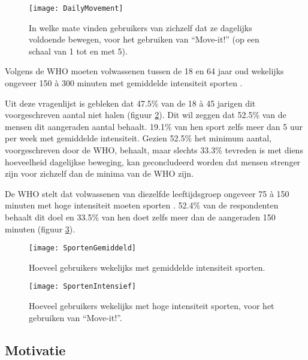 \begin{figure}
    \caption[In welke mate vinden gebruikers van zichzelf dat ze dagelijks voldoende bewegen, voor het gebruiken van ``Move-it!'']{In welke mate vinden gebruikers van zichzelf dat ze dagelijks voldoende bewegen, voor het gebruiken van ``Move-it!'' (op een schaal van 1 tot en met 5).}
    \texttt{[image: DailyMovement]}
    \label{fig:dagelijkseBeweging}
\end{figure}

Volgens de WHO moeten volwassenen tussen de 18 en 64 jaar oud wekelijks ongeveer 150 à 300 minuten met gemiddelde intensiteit sporten \autocite{Bull2020}.

Uit deze vragenlijst is gebleken dat 47.5\% van de 18 à 45 jarigen dit voorgeschreven aantal niet halen (figuur \ref{fig:gemiddeldSporten}). Dit wil zeggen dat 52.5\% van de mensen dit aangeraden aantal behaalt. 19.1\% van hen sport zelfs meer dan 5 uur per week met gemiddelde intensiteit. Gezien 52.5\% het minimum aantal, voorgeschreven door de WHO, behaalt, maar slechts 33.3\% tevreden is met diens hoeveelheid dagelijkse beweging, kan geconcludeerd worden dat mensen strenger zijn voor zichzelf dan de minima van de WHO zijn.

De WHO stelt dat volwassenen van diezelfde leeftijdsgroep ongeveer 75 à 150 minuten met hoge intensiteit moeten sporten \autocite{Bull2020}.
52.4\% van de respondenten behaalt dit doel en 33.5\% van hen doet zelfs meer dan de aangeraden 150 minuten (figuur \ref{fig:intensiefSporten}).

\begin{figure}[h]
    \caption[Hoeveel gebruikers wekelijks met gemiddelde intensiteit sporten, voor het gebruiken van ``Move-it!'']{Hoeveel gebruikers wekelijks met gemiddelde intensiteit sporten.}
    \texttt{[image: SportenGemiddeld]}
    \label{fig:gemiddeldSporten}
\end{figure}

\begin{figure}[h]
    \caption[Hoeveel gebruikers wekelijks met hoge intensiteit sporten, voor het gebruiken van ``Move-it!'']{Hoeveel gebruikers wekelijks met hoge intensiteit sporten, voor het gebruiken van ``Move-it!''.}
    \texttt{[image: SportenIntensief]}
    \label{fig:intensiefSporten}
\end{figure}

\subsection{Motivatie}

